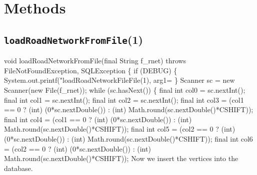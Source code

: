 \section{Methods}

\subsection{\texttt{loadRoadNetworkFromFile}(1)}
\nwenddocs{}\endmoddef{}
void loadRoadNetworkFromFile(final String f_rnet) throws FileNotFoundException, SQLException \{
  if (DEBUG) \{
    System.out.printf("loadRoadNetworkFileFile(1), arg1=%
  \}
  Scanner sc = new Scanner(new File(f_rnet));
  while (sc.hasNext()) \{
\eatline
{}\nwendcode{}
\nwenddocs{}\plusendmoddef
final int col0 = sc.nextInt();
final int col1 = sc.nextInt();
final int col2 = sc.nextInt();
final int col3 = (col1 == 0 ? (int) (0*sc.nextDouble()) : (int) Math.round(sc.nextDouble()*CSHIFT));
final int col4 = (col1 == 0 ? (int) (0*sc.nextDouble()) : (int) Math.round(sc.nextDouble()*CSHIFT));
final int col5 = (col2 == 0 ? (int) (0*sc.nextDouble()) : (int) Math.round(sc.nextDouble()*CSHIFT));
final int col6 = (col2 == 0 ? (int) (0*sc.nextDouble()) : (int) Math.round(sc.nextDouble()*CSHIFT));
\nwendcode{}\nwdocspar
{\small Now we insert the vertices into the database.}
\nwenddocs{}\plusendmoddef
